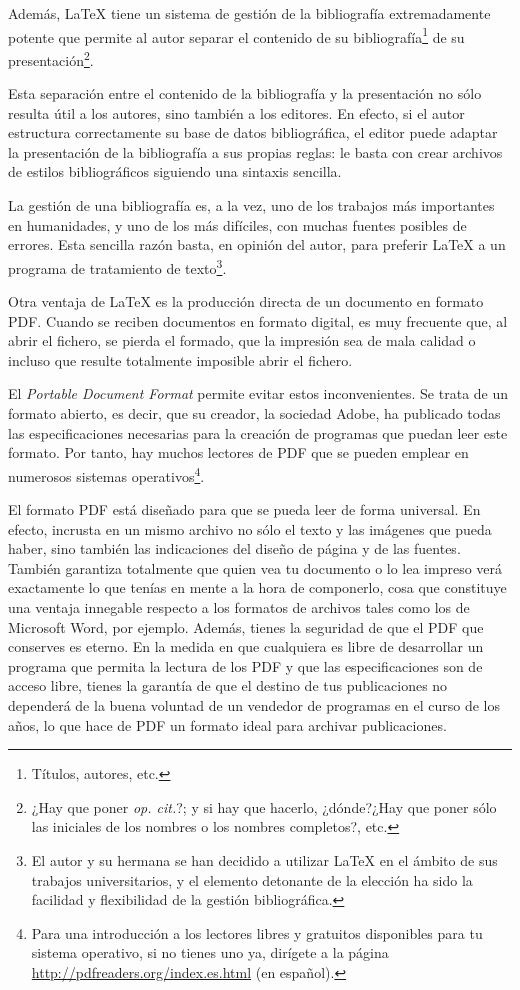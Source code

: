Además, \LaTeX{} tiene un sistema de gestión de la bibliografía extremadamente potente que permite al autor separar el contenido de su bibliografía\footnote{Títulos, autores, etc.} de su presentación\footnote{¿Hay que poner \emph{op. cit.}?; y si hay que hacerlo, ¿dónde?¿Hay que poner sólo las iniciales de los nombres o los nombres completos?, etc.}.

Esta separación entre el contenido de la bibliografía y la presentación no sólo resulta útil a los autores, sino también a los editores. En efecto, si el autor estructura correctamente su base de datos bibliográfica, el editor puede adaptar la presentación de la bibliografía a sus propias reglas: le basta con crear archivos de estilos bibliográficos siguiendo una sintaxis sencilla.

La gestión de una bibliografía es, a la vez, uno de los trabajos más importantes en humanidades, y uno de los más difíciles, con muchas fuentes posibles de errores. Esta sencilla razón basta, en opinión del autor, para preferir \LaTeX{} a un programa de tratamiento de texto\footnote{El autor y su hermana se han decidido a utilizar \LaTeX{} en el ámbito de sus trabajos universitarios, y el elemento detonante de la elección ha sido la facilidad y flexibilidad de la gestión bibliográfica.}.

Otra ventaja de  \LaTeX{} es la producción directa de un documento en formato PDF. Cuando se reciben documentos en formato digital, es muy frecuente que, al abrir el fichero, se pierda el formado, que la impresión sea de mala calidad o incluso que resulte totalmente imposible abrir el fichero.

El \emph{\textenglish{Portable Document Format}} permite evitar estos inconvenientes. Se trata de un formato abierto, es decir, que su creador,  la sociedad Adobe, ha publicado todas las especificaciones necesarias para la creación de programas que puedan leer este formato. Por tanto, hay muchos lectores de PDF que se pueden emplear en numerosos sistemas operativos\footnote{Para una introducción a los lectores libres y gratuitos disponibles para tu sistema operativo, si no tienes uno ya, dirígete a la página \url{http://pdfreaders.org/index.es.html} (en español).}.

El formato PDF está diseñado para que se pueda leer de forma universal. En efecto, incrusta en un mismo archivo no sólo el texto y las imágenes que pueda haber, sino también las indicaciones del diseño de página y de las fuentes. También garantiza totalmente que quien vea tu documento o lo lea impreso verá exactamente lo que tenías en mente a la hora de componerlo, cosa que constituye una ventaja innegable respecto a los formatos de archivos tales como los de Microsoft Word, por ejemplo. Además, tienes la seguridad de que el PDF que conserves es eterno. En la medida en que cualquiera es libre de desarrollar un programa que permita la lectura de los PDF y que las especificaciones son de acceso libre, tienes la garantía de que el destino de tus publicaciones no dependerá de la buena voluntad de un vendedor de programas en el curso de los años, lo que hace de PDF un formato ideal para archivar publicaciones.

